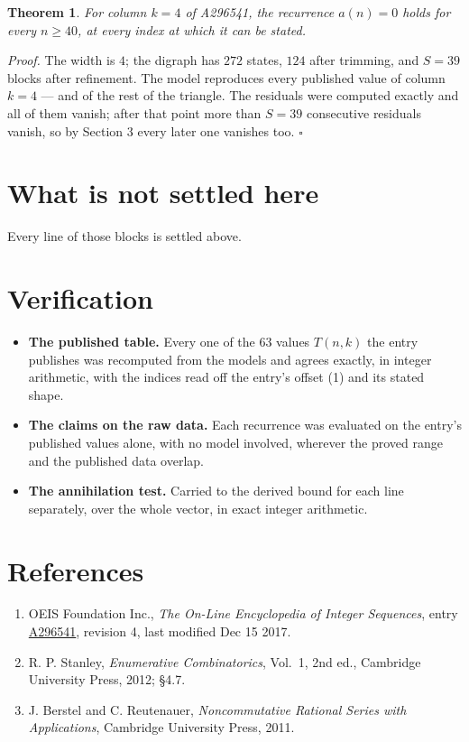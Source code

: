 \documentclass[11pt]{article}
\newtheorem{theorem}{Theorem}
\theoremstyle{definition}
\begin{document}
\begin{theorem} For column $k = 4$ of A296541, the recurrence $a(n) = 0$ holds for every $n \ge 40$, at every index at which it can be stated.\end{theorem}

{\itshape Proof.} The width is $4$; the digraph has $272$ states, $124$ after trimming, and $S = 39$ blocks after refinement. The model reproduces every published value of column $k = 4$ --- and of the rest of the triangle. The residuals were computed exactly and all of them vanish; after that point more than $S = 39$ consecutive residuals vanish, so by Section 3 every later one vanishes too. $\square$

\section{What is not settled here}

Every line of those blocks is settled above.

\section{Verification}

\begin{itemize}

\item {\bfseries The published table.} Every one of the 63 values $T(n,k)$ the entry publishes was recomputed from the models and agrees exactly, in integer arithmetic, with the indices read off the entry's offset (1) and its stated shape.

\item {\bfseries The claims on the raw data.} Each recurrence was evaluated on the entry's published values alone, with no model involved, wherever the proved range and the published data overlap.

\item {\bfseries The annihilation test.} Carried to the derived bound for each line separately, over the whole vector, in exact integer arithmetic.

\end{itemize}

\section{References}

\begin{enumerate}

\item OEIS Foundation Inc., \emph{The On-Line Encyclopedia of Integer Sequences}, entry \href{https://oeis.org/A296541}{A296541}, revision 4, last modified Dec 15 2017.

\item R. P. Stanley, \emph{Enumerative Combinatorics}, Vol.~1, 2nd ed., Cambridge University Press, 2012; \S4.7.

\item J. Berstel and C. Reutenauer, \emph{Noncommutative Rational Series with Applications}, Cambridge University Press, 2011.

\end{enumerate}
\end{document}
